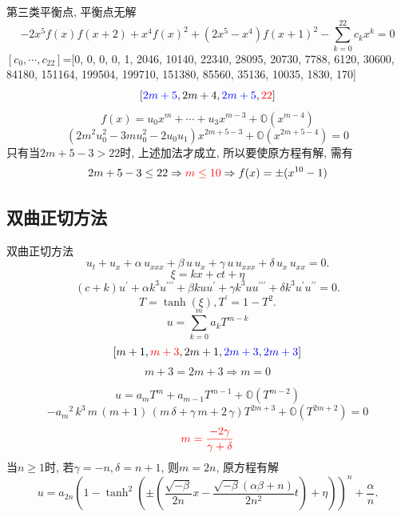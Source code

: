 \documentclass[handout]{beamer}
\newcommand{\sbrace}[1]{\left(#1\right)}
\newcommand{\OO}{\ensuremath{\mathbb O}}%
\newcommand{\red}[1]{{\color{red}#1}}
\newcommand{\blue}[1]{{\color{blue}#1}}
\begin{document}
\begin{frame}
第三类平衡点, 平衡点无解
\[
    -2x^5f(x)f(x+2)+x^4f(x)^2+(2x^5-x^4)f(x+1)^2-\sum_{k=0}^{22}{c_k x^k}=0
\]
$[c_0,\cdots,c_{22}]$=[0, 0, 0, 0, 1, 2046, 10140, 22340, 28095, 20730, 7788, 6120, 30600, 84180, 151164, 199504, 199710, 151380, 85560, 35136, 10035, 1830, 170]
\[
    [\blue{2m+5},2m+4,\blue{2m+5},\red{22}]
\]
\[
    f(x)=u_0 x^m +\cdots +u_3 x^{m-3}+\OO(x^{m-4})
\]
\[
    \sbrace{ 2m^2u_0^2-3mu_0^2-2u_0u_1 } x^{2m+5-3}+\OO(x^{2m+5-4})=0
\]
只有当$2m+5-3>22$时, 上述加法才成立, 所以要使原方程有解, 需有
\[
    2m+5-3 \le 22 \Rightarrow \red{m\le 10} \Rightarrow f(x)=\pm (x^{10}-1)
\]
\end{frame}

\subsection{双曲正切方法}
\begin{frame}{双曲正切方法}
\begin{equation*}
{{u}_{t}}+{{u}_{x}}+\alpha\,{{u}_{xxx}}+\beta\,u\,{{u}_{x}}+\gamma\,u\,{{u}_{xxx}}+\delta\,{{u}_{x}}\,{{u}_{xx}}=0. 
\end{equation*}
\[
  \xi=kx+ct+\eta
\]
\[
(c+k)u^\prime + \alpha k^3 u^{\prime\prime\prime}+\beta k u u^\prime+\gamma k^3 u u^{\prime\prime\prime}+\delta k^3 u^\prime u^{\prime\prime} = 0. 
\]
\pause 
\[
  T=\tanh(\xi), T^\prime=1-T^2 . 
\]
\[
  u=\sum_{k=0}^{m}{a_k T^{m-k}}
\]
\pause 
\[
  [m+1,\red{m+3},2m+1,\blue{2m+3},\blue{2m+3}]
\]
\[
  m+3=2m+3\Rightarrow m=0
\]
\end{frame}

\begin{frame}
\[
  u=a_m T^m + a_{m-1} T^{m-1} + \OO(T^{m-2})
\]
\[
  -{{{a}_{m}}}^{2}\,{k}^{3}\,m\,\left( m+1\right) \,\left( m\,\delta+\gamma\,m+2\,\gamma\right)T^{2m+3}+\OO(T^{2m+2})=0
\]
\[
  \red{m=\frac{-2 \gamma}{\gamma+\delta}}
\]
当$n\ge 1$时, 若$\gamma=-n,\delta=n+1$, 则$m=2n$, 原方程有解
\begin{equation*}
u=a_{2n} \sbrace{1-\tanh^2\sbrace{\pm\sbrace{\frac{\sqrt{-\beta}}{2n}x-\frac{\sqrt{-\beta}(\alpha\beta+n)}{2n^2}t}+\eta}}^n+\frac{\alpha}{n} . 
\end{equation*}
\end{frame}
\end{document}
